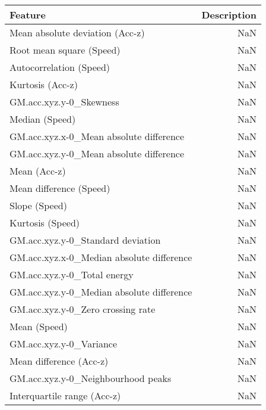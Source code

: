 \begin{table}
\centering
\label{table:reg_fs}
\begin{tabular}{lr}
\toprule
                         \textbf{Feature} & \textbf{Description} \\
\midrule
          Mean absolute deviation (Acc-z) &                  NaN \\
                 Root mean square (Speed) &                  NaN \\
                  Autocorrelation (Speed) &                  NaN \\
                         Kurtosis (Acc-z) &                  NaN \\
                  GM.acc.xyz.y-0_Skewness &                  NaN \\
                           Median (Speed) &                  NaN \\
  GM.acc.xyz.x-0_Mean absolute difference &                  NaN \\
  GM.acc.xyz.y-0_Mean absolute difference &                  NaN \\
                             Mean (Acc-z) &                  NaN \\
                  Mean difference (Speed) &                  NaN \\
                            Slope (Speed) &                  NaN \\
                         Kurtosis (Speed) &                  NaN \\
        GM.acc.xyz.y-0_Standard deviation &                  NaN \\
GM.acc.xyz.x-0_Median absolute difference &                  NaN \\
              GM.acc.xyz.y-0_Total energy &                  NaN \\
GM.acc.xyz.y-0_Median absolute difference &                  NaN \\
        GM.acc.xyz.y-0_Zero crossing rate &                  NaN \\
                             Mean (Speed) &                  NaN \\
                  GM.acc.xyz.y-0_Variance &                  NaN \\
                  Mean difference (Acc-z) &                  NaN \\
       GM.acc.xyz.y-0_Neighbourhood peaks &                  NaN \\
              Interquartile range (Acc-z) &                  NaN \\
\bottomrule
\end{tabular}
\end{table}
